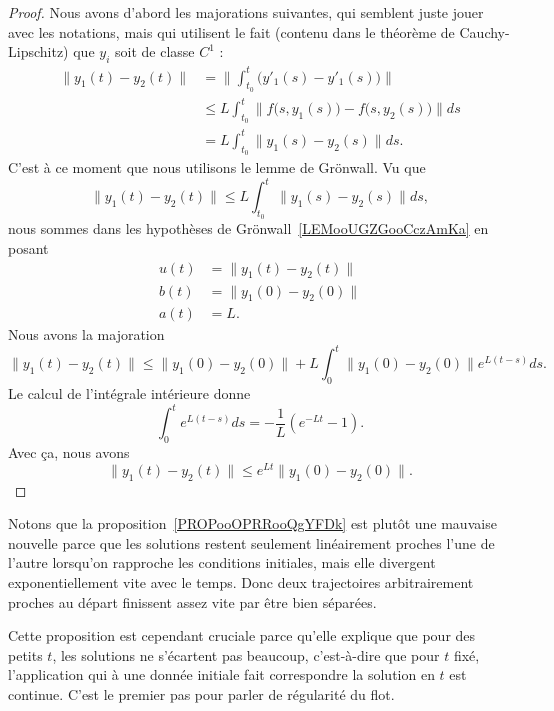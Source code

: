 \begin{proof}
    Nous avons d'abord les majorations suivantes, qui semblent juste jouer avec les notations, mais qui utilisent le fait (contenu dans le théorème de Cauchy-Lipschitz) que \( y_i\) soit de classe \( C^1\) :
    \begin{subequations}
        \begin{align}
            \| y_1(t)-y_2(t) \|&=\| \int_{t_0}^t\big( y'_1(s)-y'_1(s) \big) \|\\
            &\leq L\int_{t_0}^t\| f\big( s,y_1(s) \big)-f\big( s,y_2(s) \big) \|ds\\
            &=L\int_{t_0}^t\| y_1(s)-y_2(s) \|ds.
        \end{align}
    \end{subequations}
    C'est à ce moment que nous utilisons le lemme de Grönwall. Vu que
    \begin{equation}
            \| y_1(t)-y_2(t) \|\leq L\int_{t_0}^t\| y_1(s)-y_2(s) \|ds,
    \end{equation}
    nous sommes dans les hypothèses de Grönwall~\ref{LEMooUGZGooCczAmKa} en posant
    \begin{subequations}
        \begin{align}
            u(t)&=\| y_1(t)-y_2(t) \|\\
            b(t)&=\| y_1(0)-y_2(0) \|\\
            a(t)&=L.
        \end{align}
    \end{subequations}
    Nous avons la majoration
    \begin{equation}
        \| y_1(t)-y_2(t) \|\leq \| y_1(0)-y_2(0) \|+L\int_0^t\| y_1(0)-y_2(0) \| e^{L(t-s)}ds.
    \end{equation}
    Le calcul de l'intégrale intérieure donne
    \begin{equation}
        \int_0^t e^{L(t-s)}ds=-\frac{1}{ L }( e^{-Lt}-1).
    \end{equation}
    Avec ça, nous avons
    \begin{equation}
        \| y_1(t)-y_2(t) \|\leq  e^{Lt}\| y_1(0)-y_2(0) \|.
    \end{equation}
\end{proof}

\begin{normaltext}
    Notons que la proposition~\ref{PROPooOPRRooQgYFDk} est plutôt une mauvaise nouvelle parce que les solutions restent seulement linéairement proches l'une de l'autre lorsqu'on rapproche les conditions initiales, mais elle divergent exponentiellement vite avec le temps. Donc deux trajectoires arbitrairement proches au départ finissent assez vite par être bien séparées.

   Cette proposition est cependant cruciale parce qu'elle explique que pour des petits \( t\), les solutions ne s'écartent pas beaucoup, c'est-à-dire que pour \( t\) fixé, l'application qui à une donnée initiale fait correspondre la solution en \( t\) est continue. C'est le premier pas pour parler de régularité du flot.

\end{normaltext}

